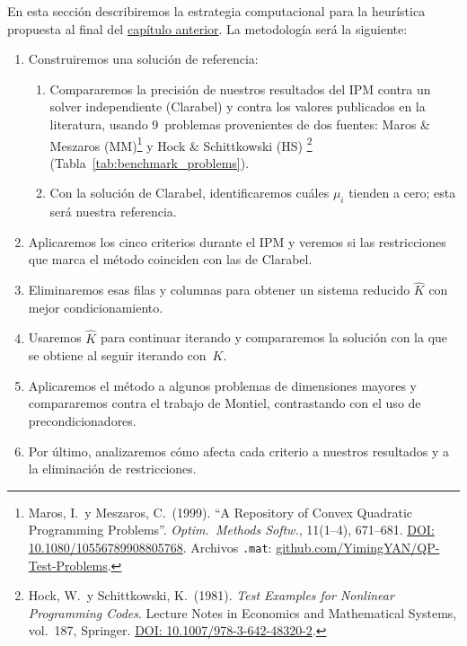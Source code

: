 En esta sección describiremos la estrategia computacional para la heurística propuesta al final del \hyperref[subsec:heuristica]{capítulo anterior}. La metodología será la siguiente:
\renewcommand{\labelenumii}{\theenumi.\arabic{enumii}}
\begin{enumerate}
    \item Construiremos una solución de referencia:
    \begin{enumerate}
        \item Compararemos la precisión de nuestros resultados del IPM contra un solver independiente (Clarabel) y contra los valores publicados en la literatura, usando 9~problemas provenientes de dos fuentes: Maros \& Meszaros (MM)\footnote{Maros, I.\ y Meszaros, C.\ (1999). ``A Repository of Convex Quadratic Programming Problems''. \textit{Optim.\ Methods Softw.}, 11(1--4), 671--681. \href{https://doi.org/10.1080/10556789908805768}{DOI: 10.1080/10556789908805768}. Archivos \texttt{.mat}: \href{https://github.com/YimingYAN/QP-Test-Problems}{github.com/YimingYAN/QP-Test-Problems}.} y Hock \& Schittkowski (HS) \footnote{Hock, W.\ y Schittkowski, K.\ (1981). \textit{Test Examples for Nonlinear Programming Codes}. Lecture Notes in Economics and Mathematical Systems, vol.~187, Springer. \href{https://doi.org/10.1007/978-3-642-48320-2}{DOI: 10.1007/978-3-642-48320-2}.} (Tabla~\ref{tab:benchmark_problems}).
        \item Con la solución de Clarabel, identificaremos cuáles $\mu_i$ tienden a cero; esta será nuestra referencia.
    \end{enumerate}
    \item Aplicaremos los cinco criterios durante el IPM y veremos si las restricciones que marca el método coinciden con las de Clarabel.
    \item Eliminaremos esas filas y columnas para obtener un sistema reducido $\widehat{K}$ con mejor condicionamiento.
    \item Usaremos $\widehat{K}$ para continuar iterando y compararemos la solución con la que se obtiene al seguir iterando con~$K$.
    \item Aplicaremos el método a algunos problemas de dimensiones mayores y compararemos contra el trabajo de Montiel, contrastando con el uso de precondicionadores.
    \item Por último, analizaremos cómo afecta cada criterio a nuestros resultados y a la eliminación de restricciones.
\end{enumerate}

